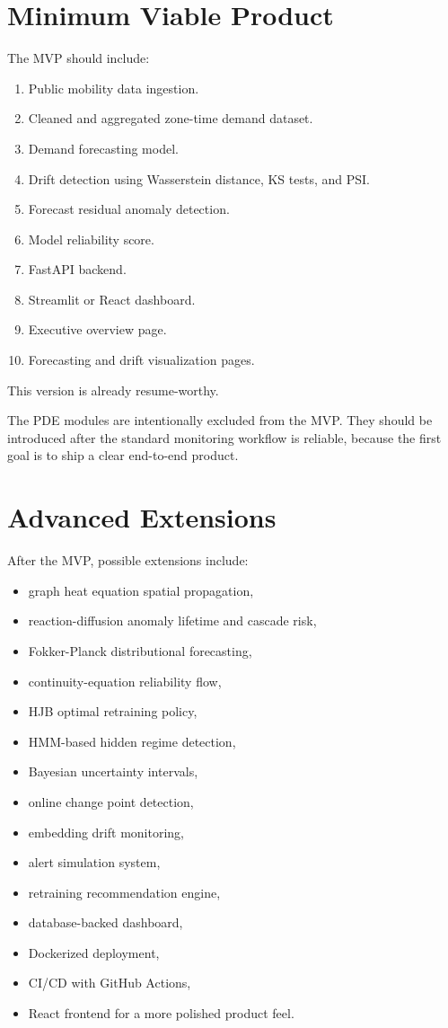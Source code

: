 \documentclass[11pt]{article}
\begin{document}
\section{Minimum Viable Product}

The MVP should include:

\begin{enumerate}
    \item Public mobility data ingestion.
    \item Cleaned and aggregated zone-time demand dataset.
    \item Demand forecasting model.
    \item Drift detection using Wasserstein distance, KS tests, and PSI.
    \item Forecast residual anomaly detection.
    \item Model reliability score.
    \item FastAPI backend.
    \item Streamlit or React dashboard.
    \item Executive overview page.
    \item Forecasting and drift visualization pages.
\end{enumerate}

This version is already resume-worthy.

The PDE modules are intentionally excluded from the MVP. They should be introduced after the standard monitoring workflow is reliable, because the first goal is to ship a clear end-to-end product.

\section{Advanced Extensions}

After the MVP, possible extensions include:

\begin{itemize}
    \item graph heat equation spatial propagation,
    \item reaction-diffusion anomaly lifetime and cascade risk,
    \item Fokker-Planck distributional forecasting,
    \item continuity-equation reliability flow,
    \item HJB optimal retraining policy,
    \item HMM-based hidden regime detection,
    \item Bayesian uncertainty intervals,
    \item online change point detection,
    \item embedding drift monitoring,
    \item alert simulation system,
    \item retraining recommendation engine,
    \item database-backed dashboard,
    \item Dockerized deployment,
    \item CI/CD with GitHub Actions,
    \item React frontend for a more polished product feel.
\end{itemize}
\end{document}
